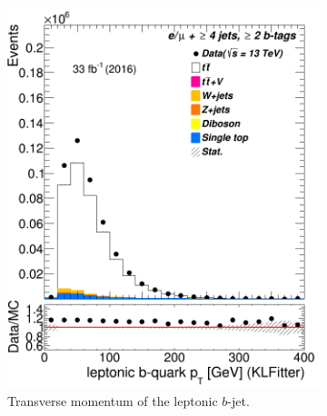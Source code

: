 \begin{figure}
	\begin{subfigure}{0.25\textwidth}
		\includegraphics[width=\linewidth]{ControlPlots_emujets_2016_4incl_2incl/klf_blep_pt_emujets_2016.png}
		\caption{Transverse momentum of the leptonic $b$-jet.} \label{fig:K35}
	\end{subfigure}
\hspace*{0.5cm}
	\begin{subfigure}{0.25\textwidth}

\end{subfigure}
\end{figure}
